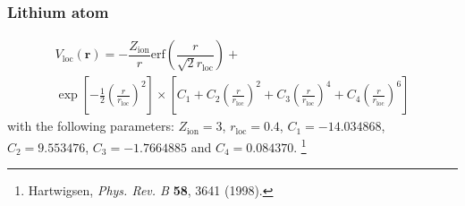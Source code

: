 \documentclass[10pt,t]{beamer}
\begin{document}
\begin{frame}
\frametitle{Lithium atom}

\begin{multline*}
V_{\mathrm{loc}}(\mathbf{r}) = 
-\dfrac{Z_{\mathrm{ion}}}{r}
\mathrm{erf}\left(
\dfrac{r}{\sqrt{2}r_{\mathrm{loc}}}
\right) + \\
\exp
\left[ -\frac{1}{2}
\left( \frac{r}{r_{\mathrm{loc}}}\right)^2
\right]
\times
\left[
C_{1} +
C_{2}\left( \frac{r}{r_{\mathrm{loc}}}\right)^2 +
C_{3}\left( \frac{r}{r_{\mathrm{loc}}}\right)^4 +
C_{4}\left( \frac{r}{r_{\mathrm{loc}}}\right)^6
\right]
\end{multline*}
with the following parameters:
$Z_{\mathrm{ion}} = 3$, $r_{\mathrm{loc}} = 0.4$,
$C_{1} = -14.034868$, $C_{2} = 9.553476$, $C_{3} = -1.7664885$
and $C_{4} = 0.084370$.
\footnote{
  Hartwigsen, \textit{Phys. Rev. B}  \textbf{58}, 3641 (1998). 
}


\end{frame}
\end{document}
